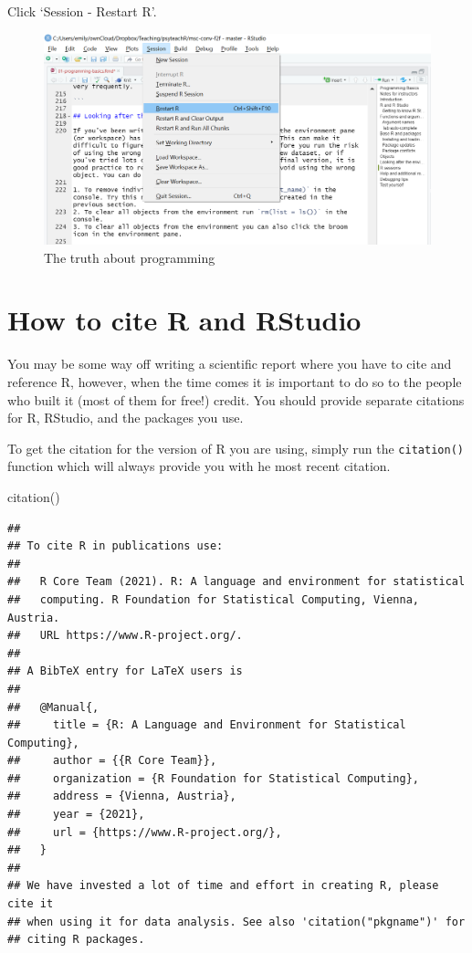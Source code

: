\documentclass[
  oneside]{book}
\newenvironment{Shaded}{\begin{snugshade}}{\end{snugshade}}
\newcommand{\FunctionTok}[1]{\textcolor[rgb]{0.00,0.00,0.00}{#1}}
\newcommand{\NormalTok}[1]{#1}
\begin{document}
Click `Session - Restart R'.

\begin{figure}

{\centering \includegraphics[width=1\linewidth]{images/new_session} 

}

\caption{The truth about programming}\label{fig:img-session}
\end{figure}

\hypertarget{how-to-cite-r-and-rstudio}{%
\section{How to cite R and RStudio}\label{how-to-cite-r-and-rstudio}}

You may be some way off writing a scientific report where you have to cite and reference R, however, when the time comes it is important to do so to the people who built it (most of them for free!) credit. You should provide separate citations for R, RStudio, and the packages you use.

To get the citation for the version of R you are using, simply run the \texttt{citation()} function which will always provide you with he most recent citation.

\begin{Shaded}
\begin{Highlighting}[]
\FunctionTok{citation}\NormalTok{()}
\end{Highlighting}
\end{Shaded}

\begin{verbatim}
## 
## To cite R in publications use:
## 
##   R Core Team (2021). R: A language and environment for statistical
##   computing. R Foundation for Statistical Computing, Vienna, Austria.
##   URL https://www.R-project.org/.
## 
## A BibTeX entry for LaTeX users is
## 
##   @Manual{,
##     title = {R: A Language and Environment for Statistical Computing},
##     author = {{R Core Team}},
##     organization = {R Foundation for Statistical Computing},
##     address = {Vienna, Austria},
##     year = {2021},
##     url = {https://www.R-project.org/},
##   }
## 
## We have invested a lot of time and effort in creating R, please cite it
## when using it for data analysis. See also 'citation("pkgname")' for
## citing R packages.
\end{verbatim}
\end{document}
